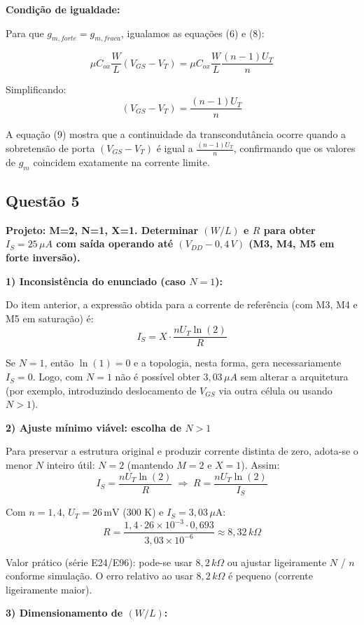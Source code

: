 ﻿\documentclass[12pt,a4paper]{article}
\begin{document}
\textbf{Condição de igualdade:}

Para que $g_{m,forte} = g_{m,fraca}$, igualamos as equações (6) e (8):

$$\mu C_{ox} \frac{W}{L} (V_{GS} - V_T) = \mu C_{ox} \frac{W}{L} \frac{(n-1)U_T}{n}$$

Simplificando:
$$(V_{GS} - V_T) = \frac{(n-1)U_T}{n} $$

A equação (9) mostra que a continuidade da transcondutância ocorre quando a sobretensão de porta $(V_{GS} - V_T)$ é igual a $\frac{(n-1)U_T}{n}$, confirmando que os valores de $g_m$ coincidem exatamente na corrente limite.



\subsection*{Questão 5}
	\textbf{Projeto: M=2, N=1, X=1. Determinar $(W/L)$ e $R$ para obter $I_S = 25\,\mu A$ com saída operando até $(V_{DD} - 0{,}4\,V)$ (M3, M4, M5 em forte inversão).}

	\textbf{1) Inconsistência do enunciado (caso $N=1$):}

Do item anterior, a expressão obtida para a corrente de referência (com M3, M4 e M5 em saturação) é:
$$ I_S = X \cdot \frac{n U_T \ln(2)}{R} $$

Se $N = 1$, então $\ln(1)=0$ e a topologia, nesta forma, gera necessariamente $I_S = 0$. Logo, com $N=1$ não é possível obter $3{,}03\,\mu A$ sem alterar a arquitetura (por exemplo, introduzindo deslocamento de $V_{GS}$ via outra célula ou usando $N>1$).

	\textbf{2) Ajuste mínimo viável: escolha de $N>1$}

Para preservar a estrutura original e produzir corrente distinta de zero, adota-se o menor $N$ inteiro útil: $N=2$ (mantendo $M=2$ e $X=1$). Assim:
$$ I_S = \frac{n U_T \ln(2)}{R} \;\Longrightarrow\; R = \frac{n U_T \ln(2)}{I_S} $$

Com $n = 1{,}4$, $U_T = 26\,\text{mV}$ (300 K) e $I_S = 3{,}03\,\mu\text{A}$:
$$ R = \frac{1{,}4 \cdot 26\times10^{-3} \cdot 0{,}693}{3{,}03\times10^{-6}} \approx 8{,}32\,k\Omega $$

Valor prático (série E24/E96): pode-se usar $8{,}2\,k\Omega$ ou ajustar ligeiramente $N$ / $n$ conforme simulação. O erro relativo ao usar $8{,}2\,k\Omega$ é pequeno (corrente ligeiramente maior).

	\textbf{3) Dimensionamento de $(W/L)$:}
\end{document}
